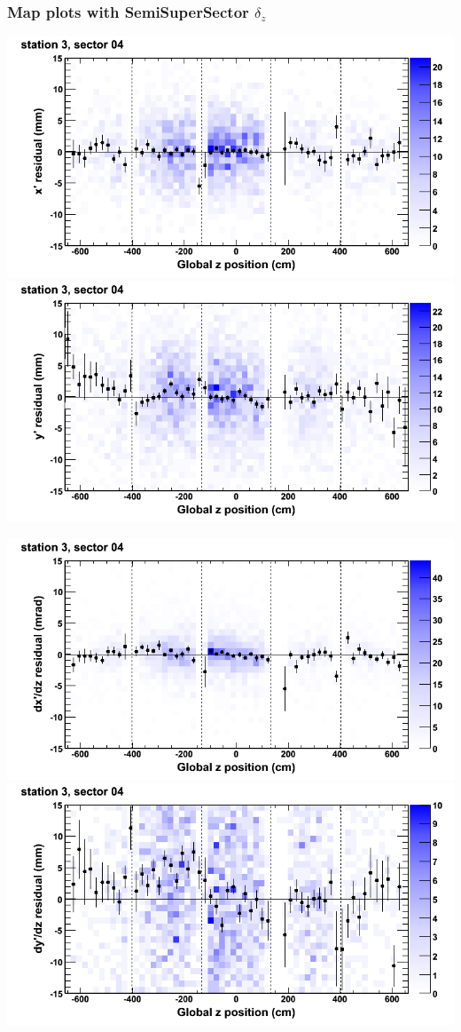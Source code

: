 \documentclass[compress]{beamer}
\begin{document}
\begin{frame}
\frametitle{Map plots with SemiSuperSector $\delta_z$}
\includegraphics[width=0.5\linewidth]{zfit_mapplots/DTvsz_st3sec04_x.png}
\includegraphics[width=0.5\linewidth]{zfit_mapplots/DTvsz_st3sec04_y.png}

\includegraphics[width=0.5\linewidth]{zfit_mapplots/DTvsz_st3sec04_dxdz.png}
\includegraphics[width=0.5\linewidth]{zfit_mapplots/DTvsz_st3sec04_dydz.png}
\end{frame}
\end{document}
